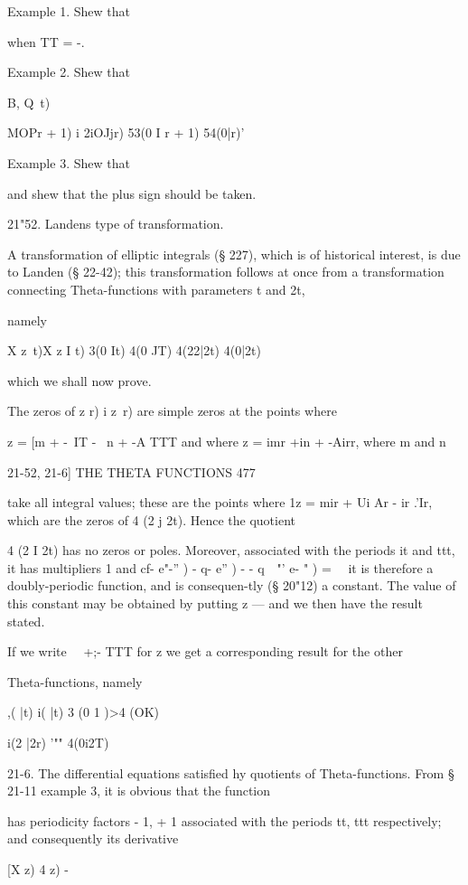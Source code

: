 Example 1. Shew that

when TT = -.

Example 2. Shew that

B, Q\ t) \ %

MOPr + 1) i 2iOJjr) 53(0 I r + 1) 54(0|r)'

Example 3. Shew that

and shew that the plus sign should be taken.

21"52. Landens type of transformation.

A transformation of elliptic integrals (§ 227), which is of historical
interest, is due to Landen (§ 22-42); this transformation follows at
once from a transformation connecting Theta-functions with parameters
t and 2t,

namely

X z\ t)X z I t) 3(0 It) 4(0 JT) 4(22|2t) 4(0|2t)

which we shall now prove.

The zeros of z r) i z\ r) are simple zeros at the points where

z = [m + -\ IT - \ n + -A TTT and where z = imr +in + -Airr, where m
and n

21-52, 21-6] THE THETA FUNCTIONS 477

take all integral values; these are the points where 1z = mir + Ui Ar
- ir .'Ir, which are the zeros of 4 (2 j 2t). Hence the quotient

 4 (2 I 2t) has no zeros or poles. Moreover, associated with the
periods it and ttt, it has multipliers 1 and cf- e"-'' ) - q- e'' ) -
- q~~"' e- " ) = \ \ it is therefore a doubly-periodic function, and
is consequen-tly (§ 20"12) a constant. The value of this constant may
be obtained by putting z — and we then have the result stated.

If we write \ \ +;- TTT for z we get a corresponding result for the
other

Theta-functions, namely

 ,( |t) i( |t) 3 (0 1 )>4 (OK)

 i(2 |2r) '"" 4(0i2T)

21-6. The differential equations satisfied hy quotients of
Theta-functions. From § 21-11 example 3, it is obvious that the
function

has periodicity factors - 1, + 1 associated with the periods tt, ttt
respectively; and consequently its derivative

[X z) 4 z) - %

